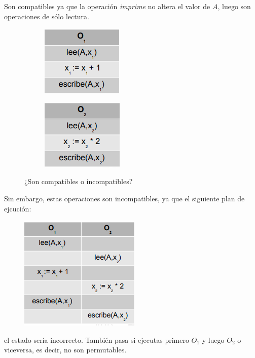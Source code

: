 Son compatibles ya que la operación \textit{imprime} no altera el valor de $A$, luego son operaciones de sólo lectura.

\begin{figure}[H]
\centering
\begin{subfigure}{.5\textwidth}
  \centering
  \includegraphics[width=.4\linewidth]{img/31.png}
\end{subfigure}%
\begin{subfigure}{.5\textwidth}
  \centering
  \includegraphics[width=.4\linewidth]{img/32.png}
\end{subfigure}
\caption{¿Son compatibles o incompatibles?}
\end{figure}

Sin embargo, estas operaciones son incompatibles, ya que el siguiente plan de ejcución:

\begin{figure}[H]
  \center
  \includegraphics[scale=0.6]{img/33.png}
\end{figure}

el estado sería incorrecto. También pasa si ejecutas primero $O_1$ y luego $O_2$ o viceversa, es decir, no son permutables.

